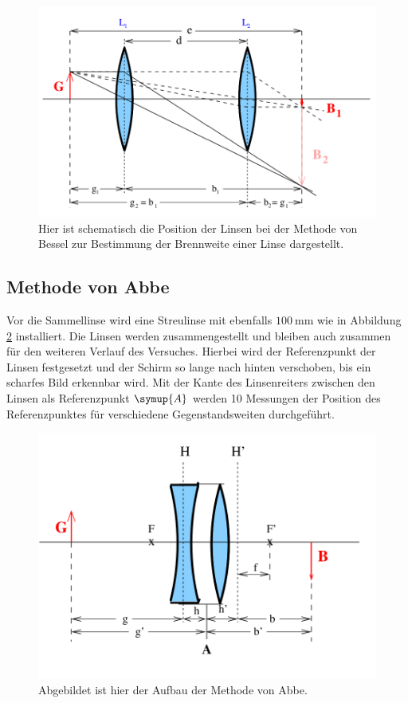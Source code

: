 \begin{figure}[H]
    \includegraphics{Bilder/Bessel.png}
    \centering
    \caption{Hier ist schematisch die Position der Linsen bei der Methode von Bessel zur Bestimmung der Brennweite einer Linse dargestellt. \cite{V408}}
    \label{fig:Bessel}
\end{figure}


\subsection{Methode von Abbe}
Vor die Sammellinse wird eine Streulinse mit ebenfalls $\qty{100}{\milli\meter}$ wie in Abbildung \ref{fig:Abbe} installiert.
Die Linsen werden zusammengestellt und bleiben auch zusammen für den weiteren Verlauf des Versuches.
Hierbei wird der Referenzpunkt der Linsen festgesetzt und der Schirm so lange nach hinten verschoben, bis ein scharfes Bild erkennbar wird.
Mit der Kante des Linsenreiters zwischen den Linsen als Referenzpunkt $\symup{A}$ werden 10 Messungen der Position des Referenzpunktes für verschiedene Gegenstandsweiten durchgeführt.


\begin{figure}[H]
    \includegraphics{Bilder/Abbe.png}
    \centering
    \caption{Abgebildet ist hier der Aufbau der Methode von Abbe. \cite{V408}}
    \label{fig:Abbe}
\end{figure}
